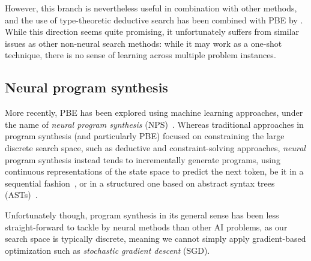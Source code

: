 \documentclass{article}
\begin{document}
However, this branch is nevertheless useful in combination with other methods,
and the use of type-theoretic deductive search has been combined with PBE by \citet{myth}.
While this direction seems quite promising,
it unfortunately suffers from similar issues as other non-neural search methods:
while it may work as a one-shot technique,
there is no sense of learning across multiple problem instances.

\subsection{Neural program synthesis}

More recently, PBE has been explored using machine learning approaches, under the name of \emph{neural program synthesis} (NPS)~\citep{nps}.
Whereas traditional approaches in program synthesis (and particularly PBE) focused on constraining the large discrete search space,
such as deductive and constraint-solving approaches,
\emph{neural} program synthesis instead tends to incrementally generate programs,
using continuous representations of the state space to predict the next token,
be it in a sequential fashion~\citep{npi,neuralmachinetranslation,alphanpi},
or in a structured one based on abstract syntax trees (ASTs)~\citep{nsps}.

Unfortunately though, program synthesis in its general sense has been less straight-forward to tackle by neural methods than other AI problems,
as our search space is typically discrete, meaning we cannot simply apply gradient-based optimization such as \emph{stochastic gradient descent} (SGD).~\citep{nps}
\end{document}
